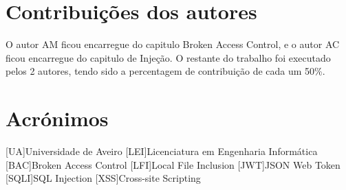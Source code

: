 \documentclass{report}
\begin{document}
\chapter*{Contribuições dos autores}
O autor AM ficou encarregue do capitulo Broken Access Control, e o autor AC ficou encarregue do capitulo de Injeção.
O restante do trabalho foi executado pelos 2 autores, tendo sido a percentagem de contribuição de cada um 50\%.


\chapter*{Acrónimos}
\begin{acronym}
[UA]{Universidade de Aveiro}
[LEI]{Licenciatura em Engenharia Informática}
[BAC]{Broken Access Control}
[LFI]{Local File Inclusion}
[JWT]{JSON Web Token}
[SQLI]{SQL Injection}
[XSS]{Cross-site Scripting}
\end{acronym}


\printbibliography
\end{document}

